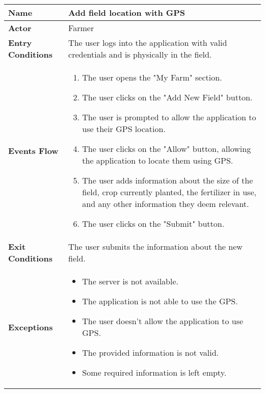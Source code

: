 \begin{center}
\renewcommand{\arraystretch}{1.25}
\begin{tabular}{|l|>{\raggedright\arraybackslash}m{12cm}|}

    \hline
    \textbf{Name} & Add field location with GPS\\
    \hline
   	\textbf{Actor} & Farmer\\
    \hline
    \textbf{Entry Conditions} & The user logs into the application with valid credentials and is physically in the field.\\
    \hline
    \textbf{Events Flow} & 
    		\begin{enumerate}
    			\item The user opens the "My Farm" section.
    			\item The user clicks on the "Add New Field" button.
    			\item The user is prompted to allow the application to use their GPS location.
    			\item The user clicks on the "Allow" button, allowing the application to locate them using GPS.
    			\item The user adds information about the size of the field, crop currently planted, the fertilizer in use, and any other information they deem relevant.
    			\item The user clicks on the "Submit" button.
    		\end{enumerate}
    	\\
    \hline
    \textbf{Exit Conditions} & The user submits the information about the new field.\\
    \hline
    \textbf{Exceptions} & 
    		\begin{itemize}
    			\item The server is not available.
    			\item The application is not able to use the GPS.
    			\item The user doesn't allow the application to use GPS.
    			\item The provided information is not valid.
    			\item Some required information is left empty.
    		\end{itemize}
    \\
    \hline
\end{tabular}
\end{center}